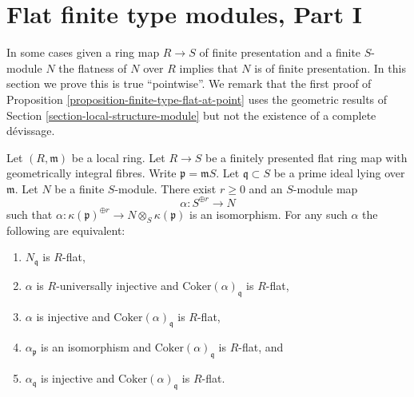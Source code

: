 \section{Flat finite type modules, Part I}
\label{section-finite-type-flat-I}

\noindent
In some cases given a ring map $R \to S$ of finite presentation and
a finite $S$-module $N$ the flatness of $N$ over $R$ implies that $N$
is of finite presentation. In this section we prove this is true
``pointwise''. We remark that the first proof of
Proposition \ref{proposition-finite-type-flat-at-point}
uses the geometric results of
Section \ref{section-local-structure-module}
but not the existence of a complete d\'evissage.

\begin{lemma}
\label{lemma-induction-step}
Let $(R, \mathfrak m)$ be a local ring. Let $R \to S$ be a finitely presented
flat ring map with geometrically integral fibres. Write
$\mathfrak p = \mathfrak mS$. Let $\mathfrak q \subset S$ be a prime ideal
lying over $\mathfrak m$. Let $N$ be a finite $S$-module.
There exist $r \geq 0$ and an $S$-module map
$$
\alpha : S^{\oplus r} \longrightarrow N
$$
such that
$\alpha : \kappa(\mathfrak p)^{\oplus r} \to N \otimes_S \kappa(\mathfrak p)$
is an isomorphism. For any such $\alpha$ the following are equivalent:
\begin{enumerate}
\item $N_{\mathfrak q}$ is $R$-flat,
\item $\alpha$ is $R$-universally injective and
$\text{Coker}(\alpha)_{\mathfrak q}$ is $R$-flat,
\item $\alpha$ is injective and
$\text{Coker}(\alpha)_{\mathfrak q}$ is $R$-flat,
\item $\alpha_{\mathfrak p}$ is an isomorphism and
$\text{Coker}(\alpha)_{\mathfrak q}$ is $R$-flat, and
\item $\alpha_{\mathfrak q}$ is injective and
$\text{Coker}(\alpha)_{\mathfrak q}$ is $R$-flat.
\end{enumerate}
\end{lemma}


